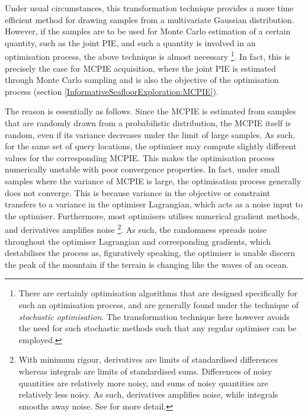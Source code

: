 			Under usual circumstances, this transformation technique provides a more time efficient method for drawing samples from a multivariate Gaussian distribution. However, if the samples are to be used for Monte Carlo estimation of a certain quantity, such as the joint PIE, and such a quantity is involved in an optimisation process, the above technique is almost necessary \footnote{There are certainly optimisation algorithms that are designed specifically for such an optimisation process, and are generally found under the technique of \textit{stochastic optimisation}. The transformation technique here however avoids the need for such stochastic methods such that any regular optimiser can be employed.}. In fact, this is precisely the case for MCPIE acquisition, where the joint PIE is estimated through Monte Carlo sampling and is also the objective of the optimisation process (section \ref{InformativeSeafloorExploration:MCPIE}).
			
			The reason is essentially as follows. Since the MCPIE is estimated from samples that are randomly drawn from a probabilistic distribution, the MCPIE itself is random, even if its variance decreases under the limit of large samples. As such, for the same set of query locations, the optimiser may compute slightly different values for the corresponding MCPIE. This makes the optimisation process numerically unstable with poor convergence properties. In fact, under small samples where the variance of MCPIE is large, the optimisation process generally does not converge. This is because variance in the objective or constraint transfers to a variance in the optimiser Lagrangian, which acts as a noise input to the optimiser. Furthermore, most optimisers utilises numerical gradient methods, and derivatives amplifies noise \footnote{With minimum rigour, derivatives are limits of standardised differences whereas integrals are limits of standardised sums. Differences of noisy quantities are relatively more noisy, and sums of noisy quantities are relatively less noisy. As such, derivatives amplifies noise, while integrals smooths away noise. See \cite{Nise:2000:CSE:519085} for more detail.}. As such, the randomness spreads noise throughout the optimiser Lagrangian and corresponding gradients, which destabilises the process as, figuratively speaking, the optimiser is unable discern the peak of the mountain if the terrain is changing like the waves of an ocean. 
			
